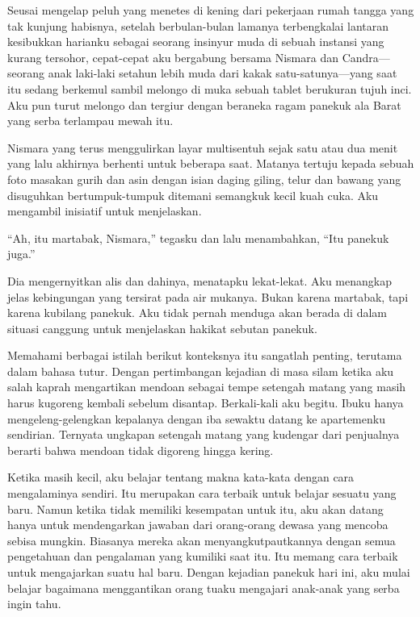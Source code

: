 \documentclass[smalldemyvopaper,11pt,twoside,onecolumn,openright,extrafontsizes]{memoir}
\begin{document}

Seusai mengelap peluh yang menetes di kening dari pekerjaan rumah tangga yang tak kunjung habisnya, setelah berbulan-bulan lamanya terbengkalai lantaran kesibukkan harianku sebagai seorang insinyur muda di sebuah instansi yang kurang tersohor, cepat-cepat aku bergabung bersama Nismara dan Candra---seorang anak laki-laki setahun lebih muda dari kakak satu-satunya---yang saat itu sedang berkemul sambil melongo di muka sebuah tablet berukuran tujuh inci. Aku pun turut melongo dan tergiur dengan beraneka ragam panekuk ala Barat yang serba terlampau mewah itu.

Nismara yang terus menggulirkan layar multisentuh sejak satu atau dua menit yang lalu akhirnya berhenti untuk beberapa saat. Matanya tertuju kepada sebuah foto masakan gurih dan asin dengan isian daging giling, telur dan bawang yang disuguhkan bertumpuk-tumpuk ditemani semangkuk kecil kuah cuka. Aku mengambil inisiatif untuk menjelaskan.

``Ah, itu martabak, Nismara,'' tegasku dan lalu menambahkan, ``Itu panekuk juga.''


Dia mengernyitkan alis dan dahinya, menatapku lekat-lekat. Aku menangkap jelas kebingungan yang tersirat pada air mukanya. Bukan karena martabak, tapi karena kubilang panekuk. Aku tidak pernah menduga akan berada di dalam situasi canggung untuk menjelaskan hakikat sebutan panekuk.


Memahami berbagai istilah berikut konteksnya itu sangatlah penting, terutama dalam bahasa tutur. Dengan pertimbangan kejadian di masa silam ketika aku salah kaprah mengartikan mendoan sebagai tempe setengah matang yang masih harus kugoreng kembali sebelum disantap. Berkali-kali aku begitu. Ibuku hanya mengeleng-gelengkan kepalanya dengan iba sewaktu datang ke apartemenku sendirian. Ternyata ungkapan setengah matang yang kudengar dari penjualnya berarti bahwa mendoan tidak digoreng hingga kering.


Ketika masih kecil, aku belajar tentang makna kata-kata dengan cara mengalaminya sendiri. Itu merupakan cara terbaik untuk belajar sesuatu yang baru. Namun ketika tidak memiliki kesempatan untuk itu, aku akan datang hanya untuk mendengarkan jawaban dari orang-orang dewasa yang mencoba sebisa mungkin. Biasanya mereka akan menyangkutpautkannya dengan semua pengetahuan dan pengalaman yang kumiliki saat itu. Itu memang cara terbaik untuk mengajarkan suatu hal baru. Dengan kejadian panekuk hari ini, aku mulai belajar bagaimana menggantikan orang tuaku mengajari anak-anak yang serba ingin tahu.
\end{document}
